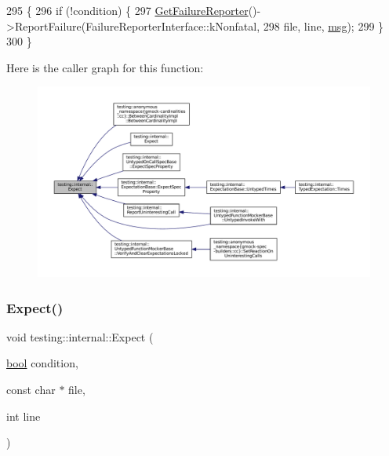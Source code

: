 \begin{DoxyCode}
295                                       \{
296   \textcolor{keywordflow}{if} (!condition) \{
297     \hyperlink{namespacetesting_1_1internal_aa261c22df383e9007129c92e36e30e62}{GetFailureReporter}()->ReportFailure(FailureReporterInterface::kNonfatal,
298                                         file, line, \hyperlink{namespacebattery__monitor__node_ab1920c64448816edd4064e494275fdff}{msg});
299   \}
300 \}
\end{DoxyCode}
Here is the caller graph for this function\+:
\nopagebreak
\begin{figure}[H]
\begin{center}
\leavevmode
\includegraphics[width=350pt]{namespacetesting_1_1internal_ab3000fc56be000e4fa6ed7cdcfee3106_icgraph}
\end{center}
\end{figure}
\mbox{\label{namespacetesting_1_1internal_a0dfe8a755bd02aa5ea162764b61a9d97}} 
\subsubsection{\texorpdfstring{Expect()}{Expect()}\hspace{0.1cm}{\footnotesize\ttfamily [2/2]}}
{\footnotesize\ttfamily void testing\+::internal\+::\+Expect (\begin{DoxyParamCaption}\item[{\hyperlink{classbool}{bool}}]{condition,  }\item[{const char $\ast$}]{file,  }\item[{int}]{line }\end{DoxyParamCaption})\hspace{0.3cm}{\ttfamily [inline]}}



